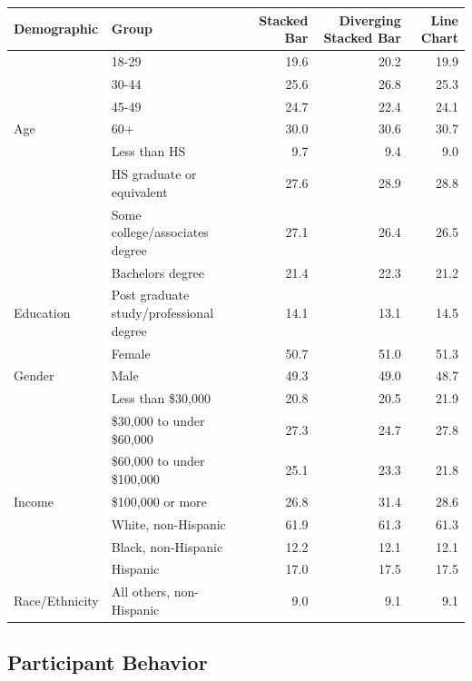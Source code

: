 \documentclass{IEEEcsmag}
\begin{document}
\begin{table}
\begin{tabular}[t]{llrrr}
\toprule
Demographic & Group & Stacked Bar & Diverging Stacked Bar & Line Chart\\
\midrule
 & 18-29 & 19.6 & 20.2 & 19.9\\
\cmidrule{2-5}
 & 30-44 & 25.6 & 26.8 & 25.3\\
\cmidrule{2-5}
 & 45-49 & 24.7 & 22.4 & 24.1\\
\cmidrule{2-5}
\multirow[t]{-4}{*}{\raggedright\arraybackslash Age} & 60+ & 30.0 & 30.6 & 30.7\\
\cmidrule{1-5}
 & Less than HS & 9.7 & 9.4 & 9.0\\
\cmidrule{2-5}
 & HS graduate or equivalent & 27.6 & 28.9 & 28.8\\
\cmidrule{2-5}
 & Some college/associates degree & 27.1 & 26.4 & 26.5\\
\cmidrule{2-5}
 & Bachelors degree & 21.4 & 22.3 & 21.2\\
\cmidrule{2-5}
\multirow[t]{-5}{*}{\raggedright\arraybackslash Education} & Post graduate study/professional degree & 14.1 & 13.1 & 14.5\\
\cmidrule{1-5}
 & Female & 50.7 & 51.0 & 51.3\\
\cmidrule{2-5}
\multirow[t]{-2}{*}{\raggedright\arraybackslash Gender} & Male & 49.3 & 49.0 & 48.7\\
\cmidrule{1-5}
 & Less than \$30,000 & 20.8 & 20.5 & 21.9\\
\cmidrule{2-5}
 & \$30,000 to under \$60,000 & 27.3 & 24.7 & 27.8\\
\cmidrule{2-5}
 & \$60,000 to under \$100,000 & 25.1 & 23.3 & 21.8\\
\cmidrule{2-5}
\multirow[t]{-4}{*}{\raggedright\arraybackslash Income} & \$100,000 or more & 26.8 & 31.4 & 28.6\\
\cmidrule{1-5}
 & White, non-Hispanic & 61.9 & 61.3 & 61.3\\
\cmidrule{2-5}
 & Black, non-Hispanic & 12.2 & 12.1 & 12.1\\
\cmidrule{2-5}
 & Hispanic & 17.0 & 17.5 & 17.5\\
\cmidrule{2-5}
\multirow[t]{-4}{*}{\raggedright\arraybackslash Race/Ethnicity} & All others, non-Hispanic & 9.0 & 9.1 & 9.1\\
\bottomrule
\end{tabular}
\end{table}

\subsection{Participant Behavior}\label{participant-behavior}
\end{document}
